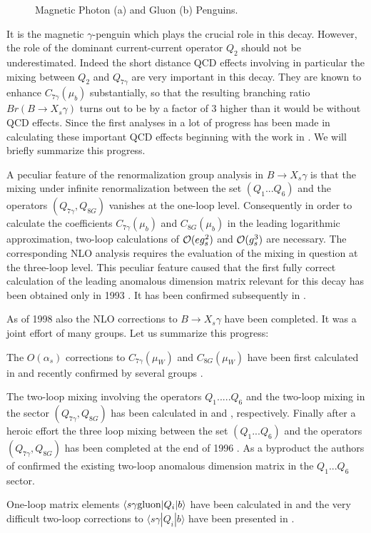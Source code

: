 \begin{figure}[hbt]
\vspace{0.10in}
\centerline{
\epsfysize=1.5in
}%
\vspace{0.08in}
\caption[]{Magnetic Photon (a) and Gluon (b) Penguins.
\label{L:12}}
\end{figure}
It is the magnetic $\gamma$-penguin which plays the crucial role in
this decay. However, the role of the dominant current-current
operator $Q_2$ should not be underestimated.
Indeed the short distance QCD effects involving in particular the
mixing between $Q_2$  and $Q_{7\gamma}$ are very important in this decay.
They are known
\cite{Bert,Desh} to enhance $C_{7\gamma}(\mu_b)$ 
substantially, so that the resulting branching ratio
$Br(B\to X_s\gamma)$ turns out to be by a factor 
of 3 higher than it would be without QCD effects.
Since the first analyses
in \cite{Bert,Desh} a lot of progress has been made in calculating
these important  QCD effects beginning with the work in \cite{Grin,Odon}. 
We will briefly summarize this progress.

A peculiar feature of the renormalization group analysis 
in $B\to X_s\gamma$ is that the mixing under infinite renormalization 
between
the set $(Q_1...Q_6)$ and the operators $(Q_{7\gamma},Q_{8G})$ vanishes
at the one-loop level. Consequently in order to calculate 
the coefficients
$C_{7\gamma}(\mu_b)$ and $C_{8G}(\mu_b)$ in the leading logarithmic
approximation, two-loop calculations of ${\cal{O}}(e g^2_s)$ 
and ${\cal{O}}(g^3_s)$
are necessary. The corresponding NLO analysis requires the evaluation
of the mixing in question at the three-loop level. 
This peculiar feature caused
that the first fully correct calculation of the leading  anomalous
dimension matrix relevant for this decay
has been obtained only in 1993 \cite{CFMRS:93,CFRS:94}.
It has been
confirmed subsequently in \cite{CCRV:94a,CCRV:94b,Mis:94}.

As of 1998 also the NLO corrections to $B\to X_s\gamma$ 
have been completed.
It was a joint effort of many groups. Let us summarize this progress: 
\bi
\item
The $O(\alpha_s)$
corrections to $C_{7\gamma}(\mu_W)$ and $C_{8G}(\mu_W)$ have been first
calculated in \cite{Yao1} and recently confirmed by several groups
\cite{GH97,BKP2,GAMB}.
\item
The two-loop
mixing involving the operators
$Q_1.....Q_6$ and the two-loop mixing
in the sector $(Q_{7\gamma},Q_{8G})$ has been calculated in 
\cite{ACMP,WEISZ,BJLW1,BJLW,ROMA1,ROMA2} 
and \cite{MisMu:94}, respectively.  
Finally after a heroic effort  the three loop mixing between
the set $(Q_1...Q_6)$ and the operators $(Q_{7\gamma},Q_{8G})$
 has been completed at the end of 1996 \cite{CZMM}.
As a byproduct the authors of \cite{CZMM} confirmed the existing
two-loop anomalous dimension matrix in the $Q_1...Q_6$ sector.
\item
One-loop matrix elements 
$\langle s\gamma {\rm gluon}|Q_i| b\rangle$ have been calculated in 
\cite{AG2,Pott} and the very difficult two-loop corrections to 
$\langle s\gamma |Q_i| b\rangle$ have been presented in \cite{GREUB}.
\ei


